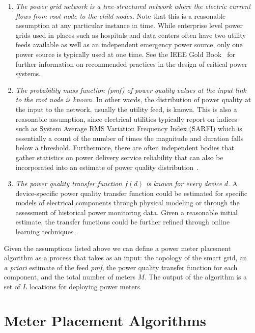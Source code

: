 \begin{enumerate}
\item \emph{The power grid network is a tree-structured network where the electric current flows from root node to the child nodes.}
Note that this is a 
reasonable assumption at any particular instance in time. While enterprise level power grids used in places such as hospitals and data centers often have two utility feeds available as well as an independent emergency power source, only one power source is typically used at one time. See the IEEE Gold Book~\cite{goldbook} for further information on recommended practices in the design of critical power systems. 

\item \emph{The probability mass function (pmf) of power quality values at the input link to the root node is known.} In other words, the distribution of power quality at the input to the network, usually the utility feed, is known.
This is also a reasonable assumption, since electrical utilities typically report on indices such as System Average RMS Variation Frequency Index (SARFI) which is essentially a count of the number of times the magnitude and duration falls below a threshold.  
Furthermore, there are often independent bodies that gather statistics on power delivery service reliability that can also be incorporated into an estimate of power quality distribution~\cite{chowdhury2004reliability}. 

\item \emph{The power quality transfer function $f(d)$ is known for every device $d$.}  
A device-specific power quality transfer function could be estimated for specific models of electrical components 
through physical modeling or through the assessment of historical power monitoring data. 
Given a reasonable initial estimate, 
the transfer functions could be further refined through online learning techniques~\cite{catherine_pri}. 
\end{enumerate}

Given the assumptions listed above we can define a power meter placement algorithm as a process that takes as 
an input: the topology of the smart grid, an \textit{a priori} estimate of the feed \emph{pmf}, the power quality transfer function for each component, and the total number of meters $M$. The output of the algorithm is a set of $L$ locations for deploying power meters. 

\section{Meter Placement Algorithms}
